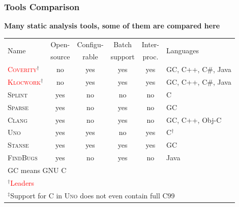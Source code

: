 \documentclass[xcolor=dvipsnames]{beamer}
\newcommand{\heading}[1]{\textbf{\textcolor{BurntOrange}{#1}}}
\begin{document}
\begin{frame}
\frametitle{Tools Comparison}
\heading{Many static analysis tools, some of them are compared here}
\small
\begin{tabular}{l|ccccl}
\multirow{2}{*}{Name} &
Open- &
Configu- &
Batch &
Inter- &
\multirow{2}{*}{Languages} \\
                  & source & rable & support & proc.  & \\ \hline
\textsc{\textcolor{red}{Coverity}}$^\dagger$
		  & no   & yes     & yes     & yes    & GC, C++, C\#, Java \\
\textsc{\textcolor{red}{Klocwork}}$^\dagger$
		  & no   & yes     & yes     & yes    & GC, C++, C\#, Java \\
\textsc{Splint}   & yes  & no      & no      & no     & C \\
\textsc{Sparse}   & yes  & no      & yes     & no     & GC \\
\textsc{Clang}    & yes  & no      & yes     & no     & GC, C++, Obj-C \\
\textsc{Uno}      & yes  & yes     & no      & yes    & C$^\dagger$ \\
\textsc{Stanse}   & yes  & yes     & yes     & yes    & GC \\
\textsc{FindBugs} & yes  & no      & yes     & no     & Java \\ \hline
\multicolumn{6}{l}{\footnotesize GC means GNU C} \\
\multicolumn{6}{l}{\footnotesize $^\dagger$\textcolor{red}{Leaders}} \\
\multicolumn{6}{l}{\footnotesize $^\ddagger$Support for C in \textsc{Uno}
does not even contain full C99} \\
\end{tabular}
\end{frame}
\end{document}
